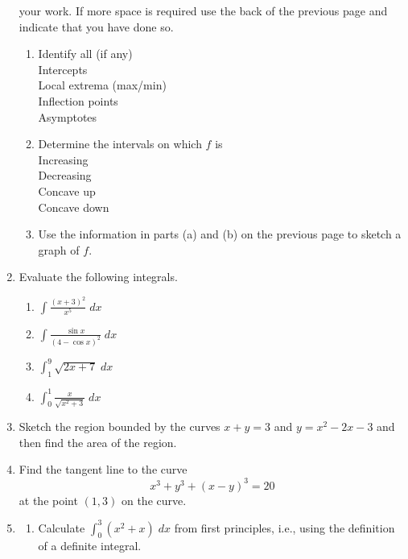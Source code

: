 \documentclass[12pt,legalpaper]{article}
\newcommand{\ds}{\displaystyle}
\begin{document}
\begin{enumerate}
  your work.  If more space is required use the back of the previous page
  and indicate that you have done so.
  \begin{enumerate}
  \item Identify all (if any)\\
    Intercepts \hrulefill\\
    Local extrema (max/min) \hrulefill\\
    Inflection points \hrulefill\\
    Asymptotes \hrulefill
  \item Determine the intervals on which $f$ is\\
    Increasing \hrulefill\\
    Decreasing \hrulefill\\
    Concave up \hrulefill\\
    Concave down \hrulefill\\
\vfill
\newpage
  \item Use the information in parts (a) and (b) on the previous page to
    sketch a graph of $f$.
  \end{enumerate}
\vfill
\newpage
\item Evaluate
  the following integrals.
  \begin{enumerate}
  \item $\ds \int\frac{(x+3)^2}{x^5} \; dx$
\vfill
  \item $\ds \int\frac{\sin x}{(4-\cos x)^2} \; dx$
\vfill
  \item $\ds \int_1^9 \sqrt{2x+7} \; dx$
\vfill
  \item $\ds \int_0^{1} \frac{x}{\sqrt{x^2+3}} \; dx$
\vfill
  \end{enumerate}
\newpage
\item Sketch 
  the region bounded by the curves $x+y=3$ and $y=x^2-2x-3$ and then
  find the area of the region.
\vfill
\newpage
\item Find 
  the tangent line to the curve
  \begin{displaymath}
    x^3+y^3+(x-y)^3=20
  \end{displaymath}
  at the point $(1,3)$ on the curve.
\vfill
\newpage
\item 
  \begin{enumerate}
  \item Calculate 
    $\ds\int_0^3 (x^2+x) \; dx$ from first principles, i.e., using
    the definition of a definite integral.

\end{enumerate}
\end{enumerate}
\end{document}
